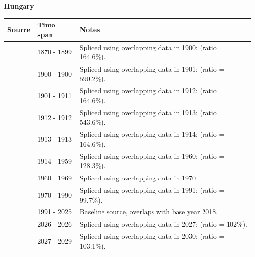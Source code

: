 \documentclass[12pt,a4paper,landscape]{article}
\begin{document}
\begin{adjustbox}{max totalsize={\paperwidth}{\paperheight},center}
\begin{minipage}[t][\textheight][t]{\textwidth}
\vspace*{0.5cm}
{}
\begin{center}
{\Large\bfseries Hungary}
\end{center}
\vspace{0.5cm}
\begin{table}[H]
\centering
\small
\begin{tabular}{|l|l|l|}
\hline
\textbf{Source} & \textbf{Time span} & \textbf{Notes} \\
\hline
\rowcolor{white}\cite{NBS}& 1870 - 1899 &Spliced using overlapping data in 1900: (ratio = 164.6\%).\\
\rowcolor{lightgray}\cite{Mitchell}& 1900 - 1900 &Spliced using overlapping data in 1901: (ratio = 590.2\%).\\
\rowcolor{white}\cite{NBS}& 1901 - 1911 &Spliced using overlapping data in 1912: (ratio = 164.6\%).\\
\rowcolor{lightgray}\cite{Mitchell}& 1912 - 1912 &Spliced using overlapping data in 1913: (ratio = 543.6\%).\\
\rowcolor{white}\cite{NBS}& 1913 - 1913 &Spliced using overlapping data in 1914: (ratio = 164.6\%).\\
\rowcolor{lightgray}\cite{Mitchell}& 1914 - 1959 &Spliced using overlapping data in 1960: (ratio = 128.3\%).\\
\rowcolor{white}\cite{WDI}& 1960 - 1969 &Spliced using overlapping data in 1970.\\
\rowcolor{lightgray}\cite{AMECO}& 1970 - 1990 &Spliced using overlapping data in 1991: (ratio = 99.7\%).\\
\rowcolor{white}\cite{OECD_EO}& 1991 - 2025 &Baseline source, overlaps with base year 2018.\\
\rowcolor{lightgray}\cite{AMECO}& 2026 - 2026 &Spliced using overlapping data in 2027: (ratio = 102\%).\\
\rowcolor{white}\cite{IMF_WEO_forecast}& 2027 - 2029 &Spliced using overlapping data in 2030: (ratio = 103.1\%).\\
\hline
\end{tabular}
\end{table}
\begin{figure}[H]
\centering

\end{figure}
\end{minipage}
\end{adjustbox}
\end{document}
